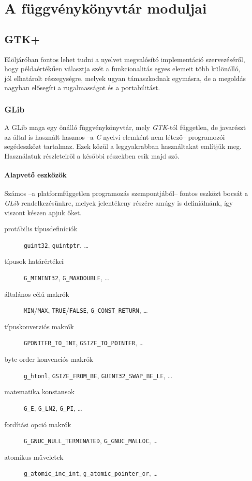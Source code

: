 
\section{A függvénykönyvtár moduljai}

\subsection{GTK+}

Elöljáróban fontos lehet tudni a nyelvet megvalósító implementáció szervezéséről, hogy példaértékűen választja szét a funkcionalitás egyes elemeit több különálló, jól elhatárolt részegységre, melyek ugyan támaszkodnak egymásra, de a megoldás nagyban elősegíti a rugalmasságot és a portabilitást.

\subsubsection{GLib}

A GLib maga egy önálló függvénykönyvtár, mely \textit{GTK}-tól független, de javarészt az által is használt hasznos --a \textit{C} nyelvi elemként nem létező-- programozói segédeszközt tartalmaz. Ezek közül a leggyakrabban használtakat említjük meg. Használatuk részleteiről a későbbi részekben esik majd szó.

\paragraph{Alapvető eszközök}

Számos --a platformfüggetlen programozás szempontjából-- fontos eszközt bocsát a \textit{GLib} rendelkezésünkre, melyek jelentékeny részére amúgy is definiálnánk, így viszont készen apjuk őket.

\begin{description}
 \item[protábilis típusdefiníciók] \texttt{guint32}, \texttt{guintptr}, \dots
 \item[típusok határértékei] \texttt{G\_MININT32}, \texttt{G\_MAXDOUBLE}, \dots
 \item[általános célú makrók] \texttt{MIN}/\texttt{MAX}, \texttt{TRUE}/\texttt{FALSE}, \texttt{G\_CONST\_RETURN}, \dots
 \item[típuskonverziós makrók] \texttt{GPONITER\_TO\_INT}, \texttt{GSIZE\_TO\_POINTER}, \dots
 \item[byte-order konvenciós makrók] \texttt{g\_htonl}, \texttt{GSIZE\_FROM\_BE}, \texttt{GUINT32\_SWAP\_BE\_LE}, \dots
 \item[matematika konstansok] \texttt{G\_E}, \texttt{G\_LN2}, \texttt{G\_PI}, \dots
 \item[fordítási opció makrók] \texttt{G\_GNUC\_NULL\_TERMINATED}, \texttt{G\_GNUC\_MALLOC}, \dots
 \item[atomikus műveletek] \texttt{g\_atomic\_inc\_int}, \texttt{g\_atomic\_pointer\_or}, \dots
\end{description}

